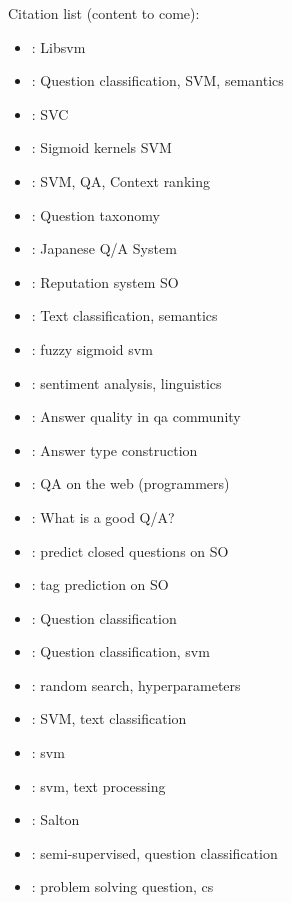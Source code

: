Citation list (content to come):
\begin{itemize}
	\item \cite{ChangLin2011}: Libsvm
	\item \cite{XuZhouWang2012}: Question classification, SVM, semantics
	\item \cite{HsuChangLinEtAl2003}: SVC
	\item \cite{LinLin2003}: Sigmoid kernels SVM
	\item \cite{YenWuYangEtAl2013}: SVM, QA, Context ranking
	\item \cite{NielsenBuckinghamKnollEtAl2008}: Question taxonomy
	\item \cite{Isozaki2005}: Japanese Q/A System
	\item \cite{Movshovitz-AttiasMovshovitz-AttiasSteenkisteEtAl2013}: Reputation system SO
	\item \cite{BloehdornHotho2004}: Text classification, semantics
	\item \cite{HanDingLing-Feng2006}: fuzzy sigmoid svm
	\item \cite{ZhangWuLan2015}: sentiment analysis, linguistics
	\item \cite{ShahPomerantz2010}: Answer quality in qa community
	\item \cite{TobaAdrianiManurung2011}: Answer type construction
	\item \cite{TreudeBarzilayStorey2011}: QA on the web (programmers)
	\item \cite{SlowiaczekKlaymanShermanEtAl1992}: What is a good Q/A?
	\item \cite{LezinaKuznetsov2013}: predict closed questions on SO
	\item \cite{StanleyByrne2013}: tag prediction on SO
	\item \cite{HuangThintQin2008}: Question classification
	\item \cite{ZhangLee2003}: Question classification, svm
	\item \cite{BergstraBengio2012}: random search, hyperparameters
	\item \cite{TongKoller2002}: SVM, text classification
	\item \cite{HearstDumaisOsmanEtAl1998}: svm
	\item \cite{Kaestner2013}: svm, text processing
	\item \cite{Dubin2004}: Salton	
	\item \cite{NguyenNguyenShimazu2008}: semi-supervised, question classification
	\item \cite{RagonisShilo2013}: problem solving question, cs

\end{itemize}
